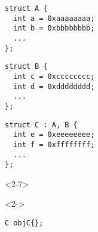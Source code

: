 \begin{frame}[fragile]

\begin{noteblock}{}
\begin{threecols}
\begin{lstlisting}[basicstyle=\scriptsize]
struct A {
  int a = 0xaaaaaaaa;
  int b = 0xbbbbbbbb;
  ...
};
\end{lstlisting}
\threecolssep
\begin{lstlisting}[basicstyle=\scriptsize]
struct B {
  int c = 0xcccccccc;
  int d = 0xdddddddd;
  ...
};
\end{lstlisting}
\threecolssep
\begin{lstlisting}[basicstyle=\scriptsize]
struct C : A, B {
  int e = 0xeeeeeeee;
  int f = 0xffffffff;
  ...
};
\end{lstlisting}
\end{threecols}
\end{noteblock}

\begin{overlayarea}{\textwidth}{4cm}
\begin{onlyenv}<2-7>
\begin{twocols}
\begin{yesblock}<2->
\begin{lstlisting}
C objC{};
\end{lstlisting}
\end{yesblock}


\end{twocols}
\end{onlyenv}
\end{overlayarea}
\end{frame}
